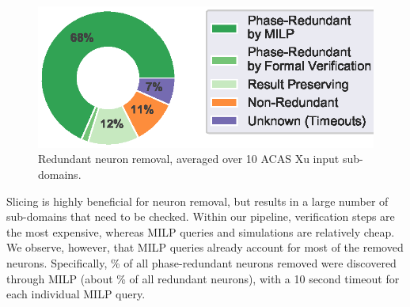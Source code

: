 \documentclass[10pt, conference, twocolumn, compsocconf]{IEEEtran}
\theoremstyle{remark}
\begin{document}
\begin{figure}[htp]
\begin{center}
\includegraphics[scale=0.5]{figures/acas_10_average}
\end{center}
\caption {Redundant neuron removal, averaged over 10 ACAS Xu input
  sub-domains.}
\label{fig:evaluation_acas}
\end{figure}

 
 
 


Slicing is highly beneficial for neuron removal, but results in a
large number of sub-domains that need to be checked. Within our
pipeline, verification steps are the most expensive, whereas MILP
queries and simulations are relatively cheap. We observe, however,
that MILP queries already account for most of the removed neurons.
Specifically, \statsMilp\% of all phase-redundant neurons removed were
discovered through MILP (about \% of all redundant neurons), with a 10 second
timeout for each individual MILP query. 
\end{document}
